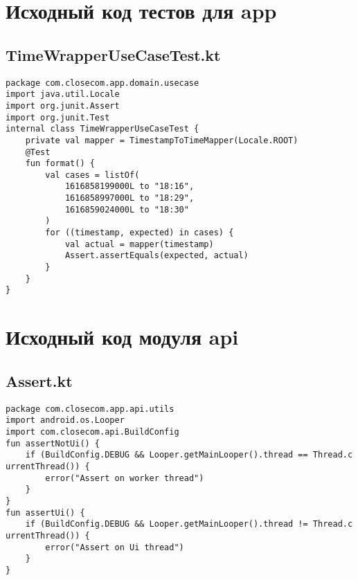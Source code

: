 \documentclass[listing]{espd}
\begin{document}
\section{Исходный код тестов для app}

\subsection{TimeWrapperUseCaseTest.kt}
\begin{verbatim}
package com.closecom.app.domain.usecase
import java.util.Locale
import org.junit.Assert
import org.junit.Test
internal class TimeWrapperUseCaseTest {
    private val mapper = TimestampToTimeMapper(Locale.ROOT)
    @Test
    fun format() {
        val cases = listOf(
            1616858199000L to "18:16",
            1616858997000L to "18:29",
            1616859024000L to "18:30"
        )
        for ((timestamp, expected) in cases) {
            val actual = mapper(timestamp)
            Assert.assertEquals(expected, actual)
        }
    }
}
\end{verbatim}

\section{Исходный код модуля api}

\subsection{Assert.kt}
\begin{verbatim}
package com.closecom.app.api.utils
import android.os.Looper
import com.closecom.api.BuildConfig
fun assertNotUi() {
    if (BuildConfig.DEBUG && Looper.getMainLooper().thread == Thread.c
urrentThread()) {
        error("Assert on worker thread")
    }
}
fun assertUi() {
    if (BuildConfig.DEBUG && Looper.getMainLooper().thread != Thread.c
urrentThread()) {
        error("Assert on Ui thread")
    }
}
\end{verbatim}
\end{document}
